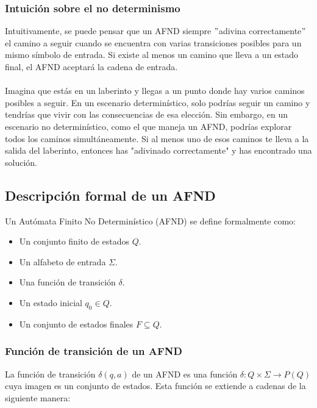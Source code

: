 \documentclass[11pt]{article}
\begin{document}
    \subsubsection{Intuición sobre el no determinismo}

    Intuitivamente, se puede pensar que un AFND siempre \("\)adivina correctamente\("\) el camino a seguir cuando se encuentra con varias transiciones posibles para un mismo símbolo de entrada. Si existe al menos un camino que lleva a un estado final, el AFND aceptará la cadena de entrada.\\\\
    Imagina que estás en un laberinto y llegas a un punto donde hay varios caminos posibles a seguir. En un escenario determinístico, solo podrías seguir un camino y tendrías que vivir con las consecuencias de esa elección. Sin embargo, en un escenario no determinístico, como el que maneja un AFND, podrías explorar todos los caminos simultáneamente. Si al menos uno de esos caminos te lleva a la salida del laberinto, entonces has "adivinado correctamente" y has encontrado una solución.

    \subsection{Descripción formal de un AFND}

    Un Autómata Finito No Determinístico (AFND) se define formalmente como:

    \begin{itemize}
        \item Un conjunto finito de estados $Q$.
        \item Un alfabeto de entrada $\Sigma$.
        \item Una función de transición $\delta$.
        \item Un estado inicial $q_0 \in Q$.
        \item Un conjunto de estados finales $F \subseteq Q$.
    \end{itemize}

    \subsubsection{Función de transición de un AFND}

    La función de transición $\delta(q, a)$ de un AFND es una función $\delta : Q \times \Sigma \rightarrow P(Q)$ cuya imagen es un conjunto de estados. Esta función se extiende a cadenas de la siguiente manera:
\end{document}
